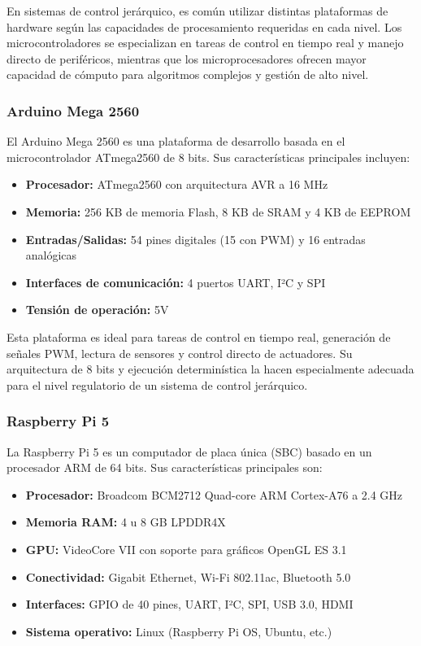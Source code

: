 En sistemas de control jerárquico, es común utilizar distintas plataformas de hardware según las capacidades de procesamiento requeridas en cada nivel. Los microcontroladores se especializan en tareas de control en tiempo real y manejo directo de periféricos, mientras que los microprocesadores ofrecen mayor capacidad de cómputo para algoritmos complejos y gestión de alto nivel.

\subsubsection{Arduino Mega 2560}

El Arduino Mega 2560 es una plataforma de desarrollo basada en el microcontrolador ATmega2560 de 8 bits. Sus características principales incluyen:

\begin{itemize}
    \item \textbf{Procesador:} ATmega2560 con arquitectura AVR a 16 MHz
    \item \textbf{Memoria:} 256 KB de memoria Flash, 8 KB de SRAM y 4 KB de EEPROM
    \item \textbf{Entradas/Salidas:} 54 pines digitales (15 con PWM) y 16 entradas analógicas
    \item \textbf{Interfaces de comunicación:} 4 puertos UART, I²C y SPI
    \item \textbf{Tensión de operación:} 5V
\end{itemize}

Esta plataforma es ideal para tareas de control en tiempo real, generación de señales PWM, lectura de sensores y control directo de actuadores. Su arquitectura de 8 bits y ejecución determinística la hacen especialmente adecuada para el nivel regulatorio de un sistema de control jerárquico.

\subsubsection{Raspberry Pi 5}

La Raspberry Pi 5 es un computador de placa única (SBC) basado en un procesador ARM de 64 bits. Sus características principales son:

\begin{itemize}
    \item \textbf{Procesador:} Broadcom BCM2712 Quad-core ARM Cortex-A76 a 2.4 GHz
    \item \textbf{Memoria RAM:} 4 u 8 GB LPDDR4X
    \item \textbf{GPU:} VideoCore VII con soporte para gráficos OpenGL ES 3.1
    \item \textbf{Conectividad:} Gigabit Ethernet, Wi-Fi 802.11ac, Bluetooth 5.0
    \item \textbf{Interfaces:} GPIO de 40 pines, UART, I²C, SPI, USB 3.0, HDMI
    \item \textbf{Sistema operativo:} Linux (Raspberry Pi OS, Ubuntu, etc.)
\end{itemize}

